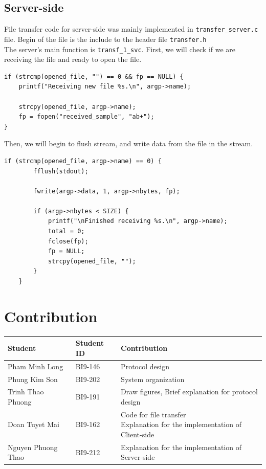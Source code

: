 \documentclass[times, 10pt]{thesisMDH}
\begin{document}
\subsection{Server-side}
File transfer code for server-side was mainly implemented in \texttt{transfer\_server.c} file. Begin of the file is the include to the header file \texttt{transfer.h}\\[0.5em]
The server's main function is  \texttt{transf\_1\_svc}. First, we will check if we are receiving the file and ready to open the file.   
\begin{lstlisting}
if (strcmp(opened_file, "") == 0 && fp == NULL) {
	printf("Receiving new file %s.\n", argp->name);

	strcpy(opened_file, argp->name);
	fp = fopen("received_sample", "ab+");
}
\end{lstlisting}
Then, we will begin to flush stream, and write data from the file in the stream. 
\begin{lstlisting}
if (strcmp(opened_file, argp->name) == 0) {
		fflush(stdout);

		fwrite(argp->data, 1, argp->nbytes, fp);

		if (argp->nbytes < SIZE) {
			printf("\nFinished receiving %s.\n", argp->name);
			total = 0;
			fclose(fp);
			fp = NULL;
			strcpy(opened_file, "");
		}
	}
\end{lstlisting}

\section{Contribution}
\begin{center}
    \begin{tabular}{|l|l|l|}
        \hline
        \textbf{Student} & \textbf{Student ID} & \textbf{Contribution}\\
        \hline
        Pham Minh Long & BI9-146 & Protocol design \\
        \hline
        Phung Kim Son & BI9-202 & System organization \\
        \hline
        Trinh Thao Phuong & BI9-191 & Draw figures, Brief explanation for protocol design \\
        \hline
        Doan Tuyet Mai & BI9-162 & \makecell[l]{Code for file transfer\\Explanation for the implementation of Client-side} \\
        \hline
        Nguyen Phuong Thao & BI9-212 & Explanation for the implementation of Server-side\\
        \hline
    \end{tabular}
\end{center}
\end{document}
